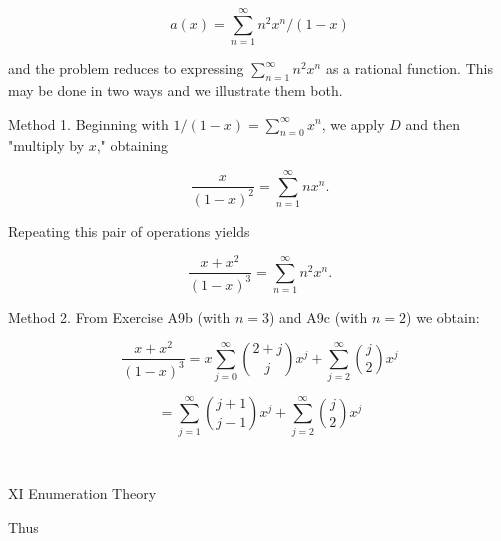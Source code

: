 $$a(x) = \sum_{n=1}^{\infty} n^2 x^n / (1-x)$$

and the problem reduces to expressing $\sum_{n=1}^{\infty} n^2 x^n$ as a rational function. This may be done in two ways and we illustrate them both.

Method 1. Beginning with $1/(1-x) = \sum_{n=0}^{\infty} x^n$, we apply $D$ and then "multiply by $x$," obtaining

$$\frac{x}{(1-x)^2} = \sum_{n=1}^{\infty} nx^n.$$

Repeating this pair of operations yields

$$\frac{x+x^2}{(1-x)^3} = \sum_{n=1}^{\infty} n^2 x^n.$$

Method 2. From Exercise A9b (with $n=3$) and A9c (with $n=2$) we obtain:

$$\frac{x+x^2}{(1-x)^3} = x \sum_{j=0}^{\infty} \binom{2+j}{j} x^j + \sum_{j=2}^{\infty} \binom{j}{2} x^j$$

$$= \sum_{j=1}^{\infty} \binom{j+1}{j-1} x^j + \sum_{j=2}^{\infty} \binom{j}{2} x^j$$

$$

XI Enumeration Theory

Thus
